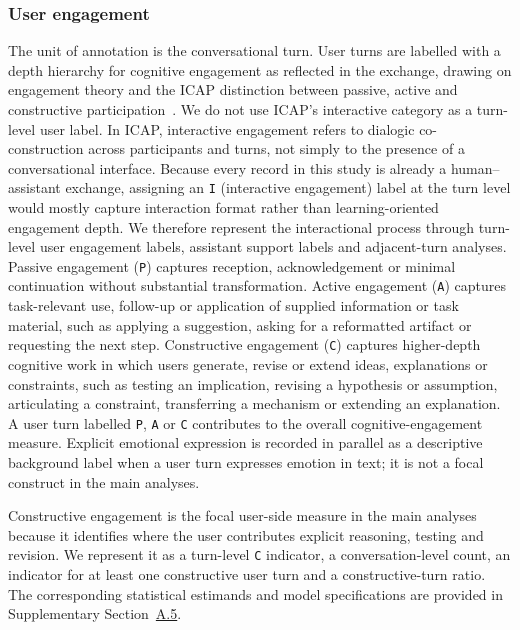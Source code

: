 \subsubsection{User engagement}

The unit of annotation is the conversational turn. User turns are labelled with a depth hierarchy for cognitive engagement as reflected in the exchange, drawing on engagement theory and the ICAP distinction between passive, active and constructive participation~\cite{fredricks2004school,chi2014icap}.
We do not use ICAP's interactive category as a turn-level user label. In ICAP, interactive engagement refers to dialogic co-construction across participants and turns, not simply to the presence of a conversational interface. Because every record in this study is already a human--assistant exchange, assigning an \texttt{I} (interactive engagement) label at the turn level would mostly capture interaction format rather than learning-oriented engagement depth. We therefore represent the interactional process through turn-level user engagement labels, assistant support labels and adjacent-turn analyses.
Passive engagement (\texttt{P}) captures reception, acknowledgement or minimal continuation without substantial transformation. Active engagement (\texttt{A}) captures task-relevant use, follow-up or application of supplied information or task material, such as applying a suggestion, asking for a reformatted artifact or requesting the next step. Constructive engagement (\texttt{C}) captures higher-depth cognitive work in which users generate, revise or extend ideas, explanations or constraints, such as testing an implication, revising a hypothesis or assumption, articulating a constraint, transferring a mechanism or extending an explanation. A user turn labelled \texttt{P}, \texttt{A} or \texttt{C} contributes to the overall cognitive-engagement measure.
Explicit emotional expression is recorded in parallel as a descriptive background label when a user turn expresses emotion in text; it is not a focal construct in the main analyses.

Constructive engagement is the focal user-side measure in the main analyses because it identifies where the user contributes explicit reasoning,
testing and revision. We represent it as a turn-level \texttt{C} indicator, a conversation-level count, an indicator for at least one constructive user turn and a
constructive-turn ratio. The corresponding statistical estimands and model specifications are provided in Supplementary Section~\hyperref[supp:a5]{A.5}.

